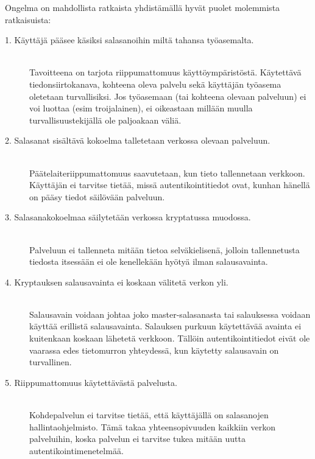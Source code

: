 \documentclass[english,gradu]{tktltiki}
\begin{document}
         Ongelma on mahdollista ratkaista yhdistämällä hyvät puolet molemmista ratkaisuista:

         \begin{description}

           \item[1. Käyttäjä pääsee käsiksi salasanoihin miltä tahansa työasemalta.] \hfill \\
               Tavoitteena on tarjota riippumattomuus käyttöympäristöstä.
               Käytettävä tiedonsiirtokanava, kohteena oleva palvelu sekä käyttäjän työasema oletetaan turvallisiksi.
               Jos työasemaan (tai kohteena olevaan palveluun) ei voi luottaa (esim troijalainen),
               ei oikeastaan millään muulla turvallisuustekijällä ole paljoakaan väliä.

           \item[2. Salasanat sisältävä kokoelma talletetaan verkossa olevaan palveluun.] \hfill \\
               Päätelaiteriippumattomuus saavutetaan, kun tieto tallennetaan verkkoon.
               Käyttäjän ei tarvitse tietää, missä autentikointitiedot ovat, kunhan hänellä on pääsy
               tiedot säilövään palveluun.

           \item[3. Salasanakokoelmaa säilytetään verkossa kryptatussa muodossa.] \hfill \\
               Palveluun ei tallenneta mitään tietoa selväkielisenä, jolloin tallennetusta tiedosta itsessään
               ei ole kenellekään hyötyä ilman salausavainta.

           \item[4. Kryptauksen salausavainta ei koskaan välitetä verkon yli.] \hfill \\
               Salausavain voidaan johtaa joko master-salasanasta tai salauksessa voidaan käyttää erillistä
               salausavainta. Salauksen purkuun käytettävää avainta ei kuitenkaan koskaan lähetetä verkkoon. Tällöin
               autentikointitiedot eivät ole vaarassa edes tietomurron yhteydessä, kun käytetty salausavain on
               turvallinen.

           \item[5. Riippumattomuus käytettävästä palvelusta.] \hfill \\
               Kohdepalvelun ei tarvitse tietää, että käyttäjällä on salasanojen hallintaohjelmisto.
               Tämä takaa yhteensopivuuden kaikkiin verkon palveluihin, koska palvelun ei tarvitse tukea mitään uutta
               autentikointimenetelmää.

         \end{description}
\end{document}
